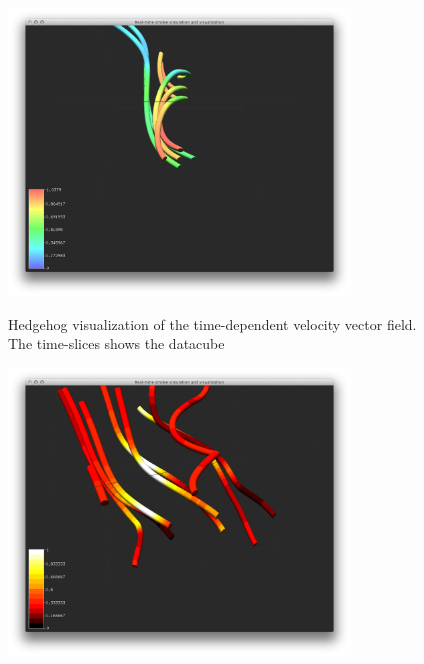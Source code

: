 \begin{figure}[htbp]
\centering
\begin{minipage}[t]{0.48\textwidth}
        \includegraphics[height=3in]{figures/streamtubes/10tubes.png}
\caption{Hedgehog visualization of the time-dependent velocity vector field. The time-slices  shows the datacube }
\label{fig:}
\end{minipage}\hspace{.04\textwidth}%
\begin{minipage}[t]{0.48\textwidth}
    \includegraphics[height=3in]{figures/streamtubes/21banding_velodensity.png}
    \caption{}
    \label{fig:}
\end{minipage}
\end{figure}    

